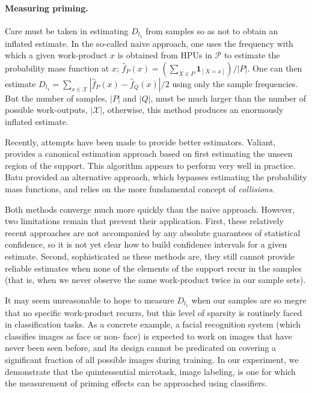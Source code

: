 \documentclass[12pt]{article}
\begin{document}
\paragraph{Measuring priming.}
Care must be taken in estimating $D_{l_1}$ from samples so as not to obtain
an inflated estimate. In the so-called naive approach, one uses the frequency 
with which a given work-product $x$ is obtained from HPUs in $\mathcal{P}$ to 
estimate the probability mass function at $x$; 
$\hat{f}_P(x) = (\sum_{X\in P} \mathbf{1}_{[X=x]})/|P|$.
One can then estimate 
$D_{l_1} = \sum_{x \in \mathcal{X}} \left|\hat{f}_P(x) - \hat{f}_Q(x) \right|/2$ using only the sample frequencies. But the number of samples, $|P|$ and 
$|Q|$, must be much larger than the number of possible work-outputs, 
$|\mathcal{X}|$, otherwise, this method produces an enormously inflated 
estimate.

Recently, attempts have been made to provide better estimators. Valiant, 
provides a canonical estimation approach based on first estimating the unseen 
region of the support. This algorithm appears to perform very well in practice.
Batu provided an alternative approach, which bypasses estimating the 
probability mass functions, and relies on the more fundamental concept of 
\textit{collisions}.

Both methods converge much more quickly than the naive approach. However, two 
limitations remain that prevent their application. First, these relatively 
recent approaches are not accompanied by any absolute guarantees of 
statistical confidence, so it is not yet clear how to build confidence 
intervals for a given estimate. Second, sophisticated as these methods are, 
they still cannot provide reliable estimates when none of the elements of the 
support recur in the samples (that is, when we never observe the same 
work-product twice in our sample sets).

It may seem unreasonable to hope to measure $D_{l_1}$ when our samples are so 
megre that no specific work-product recurrs, but this level of sparsity is 
routinely faced in classification tasks. As a concrete example, a facial 
recognition 
system (which classifies images as face or non- face) is expected to work on 
images that have never been seen before, and its design cannot be predicated on
covering a significant fraction of all possible images during training. In our 
experiment, we demonstrate that the quintessential microtask, image labeling, 
is one for which the measurement of priming effects can be approached using 
classifiers.
\end{document}
